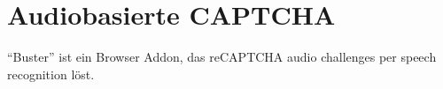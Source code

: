 \section{Audiobasierte CAPTCHA}
\label{ch:bewertung:audio}

“Buster” ist ein Browser Addon, das reCAPTCHA audio challenges per speech recognition löst.
%


